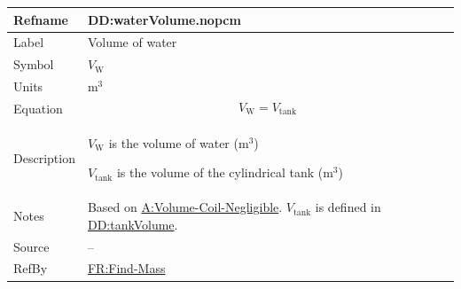 \documentclass[12pt]{article}
\begin{document}
\vspace{\baselineskip}
\noindent
\begin{minipage}{\textwidth}
\begin{tabular}{>{\raggedright}p{}>{\raggedright\arraybackslash}p{}}
\toprule \textbf{Refname} & \textbf{DD:waterVolume.nopcm}
\label{DD:waterVolume.nopcm}
\\ \midrule
Label & Volume of water
        
\\ \midrule
Symbol & ${V_{\text{W}}}$
         
\\ \midrule
Units & ${\text{m}^{3}}$
        
\\ \midrule
Equation & \begin{displaymath}
           {V_{\text{W}}}={V_{\text{tank}}}
           \end{displaymath}
\\ \midrule
Description & \begin{symbDescription}
              \item{${V_{\text{W}}}$ is the volume of water (${\text{m}^{3}}$)}
              \item{${V_{\text{tank}}}$ is the volume of the cylindrical tank (${\text{m}^{3}}$)}
              \end{symbDescription}
\\ \midrule
Notes & Based on \hyperref[assumpVCN]{A:Volume-Coil-Negligible}. ${V_{\text{tank}}}$ is defined in \hyperref[DD:tankVolume]{DD:tankVolume}.
        
\\ \midrule
Source & --
         
\\ \midrule
RefBy & \hyperref[findMass]{FR:Find-Mass}
        
\\ \bottomrule
\end{tabular}
\end{minipage}
\end{document}
